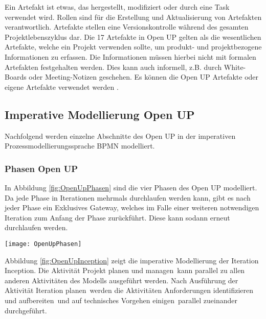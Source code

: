 Ein Artefakt ist etwas, das hergestellt, modifiziert oder durch eine Task verwendet wird. Rollen sind 
für die Erstellung und Aktualisierung von Artefakten verantwortlich. Artefakte stellen eine Versionskontrolle während des gesamten Projektlebenszyklus dar. Die 17 Artefakte in Open UP gelten als die wesentlichen Artefakte, welche ein Projekt verwenden sollte, um produkt- und projektbezogene Informationen zu erfassen. Die Informationen müssen hierbei nicht mit formalen Artefakten festgehalten werden. Dies kann auch informell, z.B. durch White-Boards oder Meeting-Notizen geschehen. Es können die Open UP Artefakte oder eigene Artefakte verwendet werden \cite{eclipseopenup}.

\subsection{Imperative Modellierung Open UP}

Nachfolgend werden einzelne Abschnitte des Open UP in der imperativen Prozessmodellierungssprache BPMN modelliert.

 \subsubsection{Phasen Open UP}

In Abbildung \ref{fig:OpenUpPhasen} sind die vier Phasen des Open UP modelliert. Da jede Phase in Iterationen mehrmals durchlaufen werden kann, gibt es nach jeder Phase ein Exklusives Gateway, welches im Falle einer weiteren notwendigen Iteration zum Anfang der Phase zurückführt. Diese kann sodann erneut durchlaufen werden.

\begin{sidewaysfigure}[htp]
\begin{center}
  \texttt{[image: OpenUpPhasen]} %
  \caption{Phasen Open UP- imperativ}
  \label{fig:OpenUpPhasen}
\end{center}
\end{sidewaysfigure}

Abbildung \ref{fig:OpenUpInception} zeigt die imperative Modellierung der Iteration Inception. Die Aktivität \grqq Projekt planen und managen\grqq \ kann parallel zu allen anderen Aktivitäten des Modells ausgeführt werden.\newline
Nach Ausführung der Aktivität \grqq Iteration planen\grqq \ werden die Aktivitäten \grqq Anforderungen identifizieren und aufbereiten\grqq \ und \grqq auf technisches Vorgehen einigen\grqq \ parallel zueinander durchgeführt.

